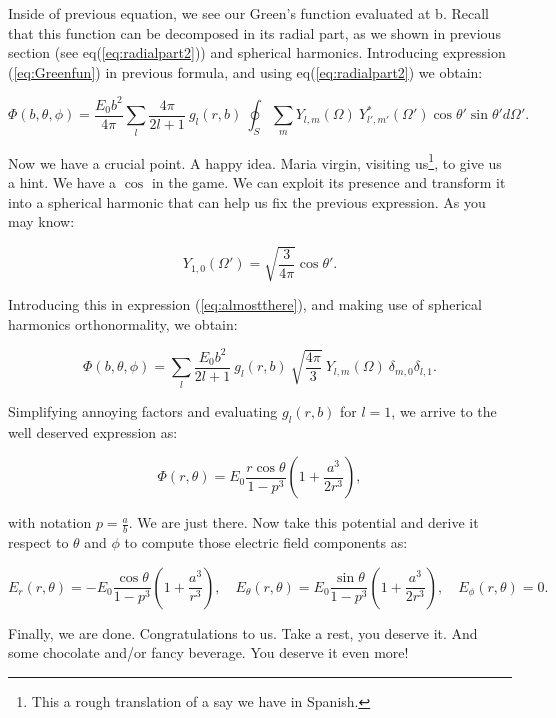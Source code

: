 Inside of previous equation, we see our Green's function evaluated at b. Recall that this function can be decomposed in its radial part, as we shown in previous section (see eq(\ref{eq:radialpart2})) and spherical harmonics. Introducing expression (\ref{eq:Greenfun}) in previous formula, and using eq(\ref{eq:radialpart2}) we obtain:
	
\begin{equation}\label{eq:almostthere}
	\Phi(b, \theta, \phi) = \frac{E_{0}b^{2}}{4\pi} \sum_{l} \frac{4\pi}{2l+1}\: g_{l}(r,b)\: \oint_{S} \sum_{m} Y_{l,m} (\Omega) \: Y^{*}_{l',m'} (\Omega') \cos \theta' \sin \theta' d\Omega'.
\end{equation}

Now we have a crucial point. A happy idea. Maria virgin, visiting us\footnote{This a rough translation of a say we have in Spanish.}, to give us a hint. We have a $\cos$ in the game. We can exploit its presence and transform it into a spherical harmonic that can help us fix the previous expression. As you may know:
	
\begin{equation}
	Y_{1,0}(\Omega') = \sqrt{\frac{3}{4 \pi}} \cos \theta'.
\end{equation}

Introducing this in expression (\ref{eq:almostthere}), and making use of spherical harmonics orthonormality, we obtain:
	
\begin{equation}
	\Phi(b, \theta, \phi) =  \sum_{l} \frac{E_{0}b^{2}}{2l+1}\: g_{l}(r,b)\: \sqrt{\frac{4\pi}{3}}\: Y_{l,m} (\Omega) \: \delta_{m,0} \delta_{l,1}. 
\end{equation}

Simplifying annoying factors and evaluating $g_{l}(r,b)$ for $l=1$, we arrive to the well deserved expression as:

\begin{equation}
	\Phi(r, \theta)=E_{0} \frac{r \cos \theta}{1-p^{3}}\left(1+\frac{a^{3}}{2 r^{3}}\right),
\end{equation}

with notation $p=\frac{a}{b}$.  We are just there. Now take this potential and derive it respect to $\theta$ and $\phi$ to compute those electric field components as:

\begin{equation}
	E_{r}(r, \theta)=-E_{0} \frac{\cos \theta}{1-p^{3}}\left(1+\frac{a^{3}}{r^{3}}\right), \quad E_{\theta}(r, \theta)=E_{0} \frac{\sin \theta}{1-p^{3}}\left(1+\frac{a^{3}}{2 r^{3}}\right), \quad E_{\phi}(r,\theta) = 0.
\end{equation}

Finally, we are done. Congratulations to us. Take a rest, you deserve it. And some chocolate and/or fancy beverage. You deserve it even more!
		



	
	
	
	
	
	
	
